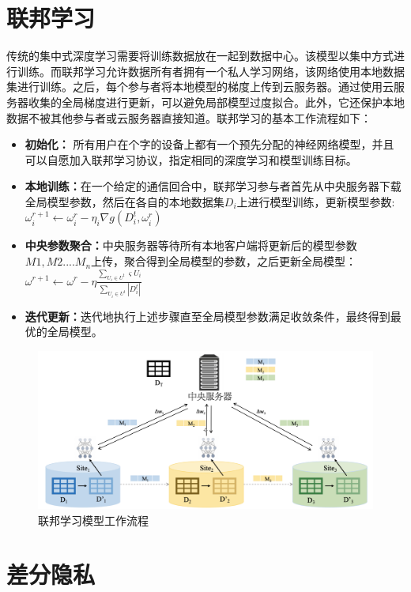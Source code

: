 \section{联邦学习}
传统的集中式深度学习需要将训练数据放在一起到数据中心。该模型以集中方式进行训练。而联邦学习允许数据所有者拥有一个私人学习网络，该网络使用本地数据集进行训练。之后，每个参与者将本地模型的梯度上传到云服务器。通过使用云服务器收集的全局梯度进行更新，可以避免局部模型过度拟合。此外，它还保护本地数据不被其他参与者或云服务器直接知道。联邦学习的基本工作流程如下：
\begin{itemize}
\item \textbf{初始化：}
所有用户在个字的设备上都有一个预先分配的神经网络模型，并且可以自愿加入联邦学习协议，指定相同的深度学习和模型训练目标。
\item  \textbf{本地训练：}在一个给定的通信回合中，联邦学习参与者首先从中央服务器下载全局模型参数，然后在各自的本地数据集$D_{i}$上进行模型训练，更新模型参数:$\omega_{i}^{r+1} \leftarrow \omega_{i}^{r}-\eta_{i} \nabla g\left(D_{i}^{t}, \omega_{i}^{r}\right)$
\item \textbf{中央参数聚合：}中央服务器等待所有本地客户端将更新后的模型参数$M1,M2....M_{n}$上传，聚合得到全局模型的参数，之后更新全局模型：$\omega^{r+1} \leftarrow \omega^{r}-\eta \frac{\sum_{U_{i} \in U^{t}} \varsigma U_{i}}{\sum_{U_{i} \in U^{t}}\left|D_{i}^{t}\right|}$
\item \textbf{迭代更新：}迭代地执行上述步骤直至全局模型参数满足收敛条件，最终得到最优的全局模型。
\end{itemize}

\begin{figure}[!hbt]
\centering
	\includegraphics[scale=0.45]{fig2/C2/联邦学习模型流程}%
	\caption{联邦学习模型工作流程}
	\label{fig:联邦学习模型工作流程}	
\end{figure}

\section{差分隐私}
